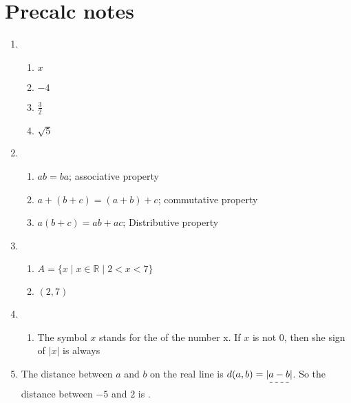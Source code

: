 \documentclass[12pt]{article}
\begin{document}
\section*{Precalc notes}

\begin{enumerate}
  \item \begin{enumerate}
          \item $x$
          \item $-4$
          \item $\frac 3 2$
          \item $\sqrt 5$
        \end{enumerate}
  \item \begin{enumerate}
          \item $ab=ba$; associative property
          \item $a + (b + c) = (a + b) + c$; commutative property
          \item $a(b + c) = ab + ac$; Distributive property
        \end{enumerate}
  \item \begin{enumerate}
          \item $A = \{x \mid x \in \mathbb{R} \mid 2 < x < 7 \}$
          \item $(2,7)$
        \end{enumerate}
  \item
        \begin{enumerate}
          \item The symbol $x$ stands for the  of the number x.
                \newline If $x$ is not 0, then she sign of $|x|$ is always 
        \end{enumerate}
  \item The distance between $a$ and $b$ on the real line is $d(a,b) = \dashuline{|a-b|}$.
        \newline So the distance between $-5$ and $2$ is .
\end{enumerate}
\end{document}
